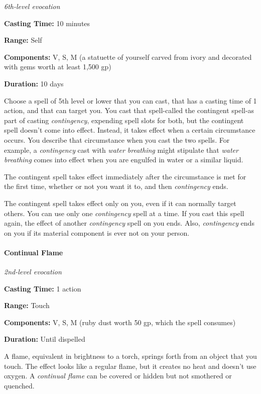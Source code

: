 \documentclass[
]{article}
\begin{document}
\emph{6th-level evocation}

\textbf{Casting Time:} 10 minutes

\textbf{Range:} Self

\textbf{Components:} V, S, M (a statuette of yourself carved from ivory
and decorated with gems worth at least 1,500 gp)

\textbf{Duration:} 10 days

Choose a spell of 5th level or lower that you can cast, that has a
casting time of 1 action, and that can target you. You cast that
spell-called the contingent spell-as part of casting \emph{contingency},
expending spell slots for both, but the contingent spell doesn't come
into effect. Instead, it takes effect when a certain circumstance
occurs. You describe that circumstance when you cast the two spells. For
example, a \emph{contingency} cast with \emph{water breathing} might
stipulate that \emph{water breathing} comes into effect when you are
engulfed in water or a similar liquid.

The contingent spell takes effect immediately after the circumstance is
met for the first time, whether or not you want it to, and then
\emph{contingency} ends.

The contingent spell takes effect only on you, even if it can normally
target others. You can use only one \emph{contingency} spell at a time.
If you cast this spell again, the effect of another \emph{contingency}
spell on you ends. Also, \emph{contingency} ends on you if its material
component is ever not on your person.

\hypertarget{continual-flame}{%
\paragraph{Continual Flame}\label{continual-flame}}

\emph{2nd-level evocation}

\textbf{Casting Time:} 1 action

\textbf{Range:} Touch

\textbf{Components:} V, S, M (ruby dust worth 50 gp, which the spell
consumes)

\textbf{Duration:} Until dispelled

A flame, equivalent in brightness to a torch, springs forth from an
object that you touch. The effect looks like a regular flame, but it
creates no heat and doesn't use oxygen. A \emph{continual flame} can be
covered or hidden but not smothered or quenched.
\end{document}

